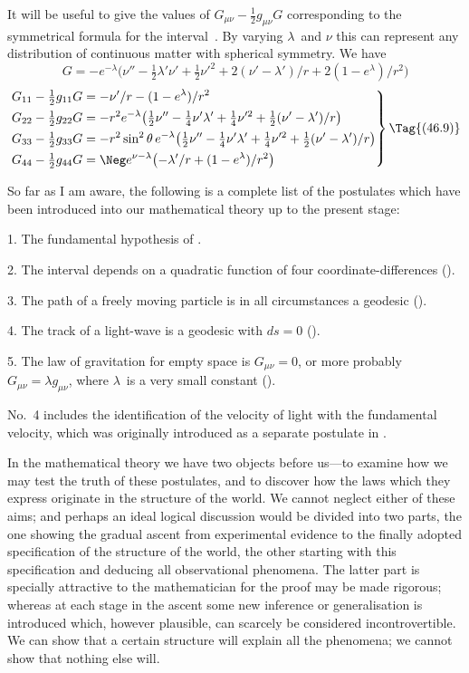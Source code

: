 \documentclass[12pt]{book}
\begin{document}
It will be useful to give the values of $G_{\mu\nu} - \frac{1}{2} g_{\mu\nu} G$ corresponding to the
symmetrical formula for the interval~. By varying $\lambda$~and $\nu$ this can represent
any distribution of continuous matter with spherical symmetry. We have
\[
G = -e^{-\lambda} \bigl(\nu'' - \tfrac{1}{2}\lambda'\nu' + \tfrac{1}{2}\nu'^{2} + 2(\nu' - \lambda')/r + 2(1 - e^{\lambda})/r^{2}\bigr)
\]
\[\left.
\begin{aligned}
  &G_{11} - \tfrac{1}{2} g_{11} G
  = -\nu'/r - (1 - e^{\lambda})/r^{2}\\
  &G_{22} - \tfrac{1}{2} g_{22} G
 = -r^{2} e^{-\lambda} \bigl(\tfrac{1}{2}\nu'' - \tfrac{1}{4}\nu'\lambda' + \tfrac{1}{4}\nu'^{2} + \tfrac{1}{2}(\nu' - \lambda')/r\bigr)\\
  &G_{33} - \tfrac{1}{2} g_{33} G
 = -r^{2}\sin^{2}\theta\, e^{-\lambda} \bigl(\tfrac{1}{2}\nu'' - \tfrac{1}{4}\nu'\lambda' + \tfrac{1}{4}\nu'^{2} + \tfrac{1}{2}(\nu' - \lambda')/r\bigr)\\
  &G_{44} - \tfrac{1}{2} g_{44} G
  = \Neg e^{\nu-\lambda} \bigl(-\lambda'/r + (1 - e^{\lambda})/r^{2}\bigr)
\end{aligned}
\right\}
\Tag{(46.9)}
\]

%

So far as I am aware, the following is a complete list of the postulates
which have been introduced into our mathematical theory up to the present
stage:

1. The fundamental hypothesis of .

2. The interval depends on a quadratic function of four coordinate\hyp{}differences
().

3. The path of a freely moving particle is in all circumstances a geodesic
().

4. The track of a light-wave is a geodesic with $ds = 0$ ().

5. The law of gravitation for empty space is $G_{\mu\nu} = 0$, or more probably
$G_{\mu\nu} = \lambda g_{\mu\nu}$, where $\lambda$~is a very small constant ().

No.~4 includes the identification of the velocity of light with the fundamental
velocity, which was originally introduced as a separate postulate in .

In the mathematical theory we have two objects before us---to examine
how we may test the truth of these postulates, and to discover how the laws
which they express originate in the structure of the world. We cannot neglect
either of these aims; and perhaps an ideal logical discussion would be divided
into two parts, the one showing the gradual ascent from experimental evidence
to the finally adopted specification of the structure of the world, the other
starting with this specification and deducing all observational phenomena.
The latter part is specially attractive to the mathematician for the proof may
be made rigorous; whereas at each stage in the ascent some new inference or
generalisation is introduced which, however plausible, can scarcely be considered
incontrovertible. We can show that a certain structure will explain
all the phenomena; we cannot show that nothing else will.
\end{document}

